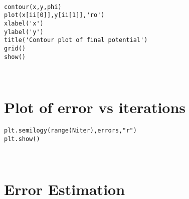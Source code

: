 \documentclass[11pt]{article}
\begin{document}
    \begin{Verbatim}

contour(x,y,phi)
plot(x[ii[0]],y[ii[1]],'ro')
xlabel('x')
ylabel('y')
title('Contour plot of final potential')
grid()
show()
\end{Verbatim}


    \begin{center}
    \end{center}
    { \hspace*{\fill} \\}
    
    \hypertarget{plot-of-error-vs-iterations}{%
\section{Plot of error vs
iterations}\label{plot-of-error-vs-iterations}}

    \begin{Verbatim}
plt.semilogy(range(Niter),errors,"r")
plt.show()
\end{Verbatim}


    \begin{center}
    \end{center}
    { \hspace*{\fill} \\}
    
    \hypertarget{error-estimation}{%
\section{Error Estimation}\label{error-estimation}}
\end{document}
